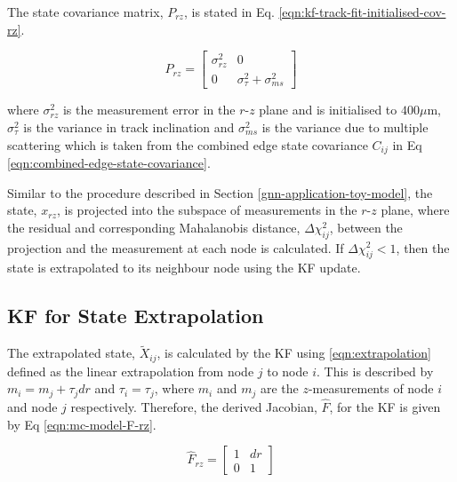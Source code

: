The state covariance matrix, $P_{rz}$, is stated in Eq. \eqref{eqn:kf-track-fit-initialised-cov-rz}.  

\begin{equation}
P_{rz} = \begin{bmatrix} \sigma_{rz}^2 & 0 \\ 0 & \sigma_{\tau}^2 + \sigma_{ms}^2 \end{bmatrix} 
\label{eqn:kf-track-fit-initialised-cov-rz}
\end{equation}

where $\sigma_{rz}^2$ is the measurement error in the $r$-$z$ plane and is initialised to $400\mu$m, $\sigma_{\tau}^2$ is the variance in track inclination and $\sigma_{ms}^2$ is the variance due to multiple scattering which is taken from the combined edge state covariance $C_{ij}$ in Eq \eqref{eqn:combined-edge-state-covariance}.

Similar to the procedure described in Section \ref{gnn-application-toy-model}, the state, $x_{rz}$, is projected into the subspace of measurements in the $r$-$z$ plane, where the residual and corresponding Mahalanobis distance, $\Delta \chi_{ij}^{2}$, between the projection and the measurement at each node is calculated. If $\Delta \chi_{ij}^{2} < 1$, then the state is extrapolated to its neighbour node using the KF update.



\subsection{KF for State Extrapolation}

The extrapolated state, $\widetilde{X}_{ij}$, is calculated by the KF using \eqref{eqn:extrapolation} defined as the linear extrapolation from node $j$ to node $i$. This is described by $m_i = m_j + \tau_j dr$ and $\tau_i = \tau_j$, where $m_i$ and $m_j$ are the $z$-measurements of node $i$ and node $j$ respectively. Therefore, the derived Jacobian, $\hat{F}$, for the KF is given by Eq \eqref{eqn:mc-model-F-rz}.


\begin{equation}
\hat{F}_{rz} = \begin{bmatrix} 1 & dr \\ 0 & 1 \end{bmatrix}
\label{eqn:mc-model-F-rz}
\end{equation}

